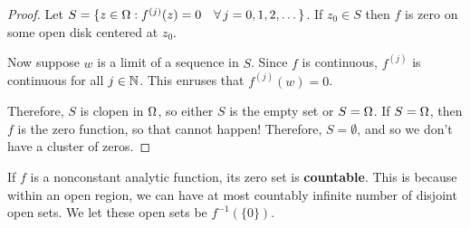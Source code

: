 \documentclass[12pt]{article}
\begin{document}
\begin{proof}
    Let $S=\{z\in \Omega : f^{(j)}(z)=0 \quad \forall\, j=0,1,2,\dots\}$. If $z_0\in S$ then $f$ is zero on some open disk centered at $z_0$. 

    Now suppose $w$ is a limit of a sequence in $S$. Since $f$ is continuous, $f^{(j)}$ is continuous for all $j\in \mathbb{N}$. This enruses that $f^{(j)}(w)=0$. 

    Therefore, $S$ is clopen in $\Omega$, so either $S$ is the empty set or $S=\Omega$. If $S=\Omega$, then $f$ is the zero function, so that cannot happen! Therefore, $S=\emptyset$, and so we don't have a cluster of zeros.
\end{proof}

\corollary If $f$ is a nonconstant analytic function, its zero set is \textbf{countable}. This is because within an open region, we can have at most countably infinite number of disjoint open sets. We let these open sets be $f^{-1}(\{0\})$.
\end{document}

